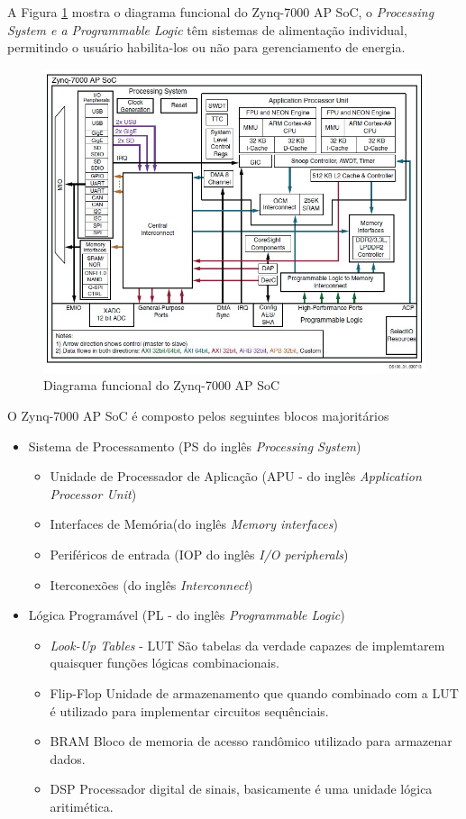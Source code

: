 A Figura \ref{diaagrama-zynq} mostra o diagrama funcional do Zynq-7000 AP SoC, o \textit{Processing System e a Programmable Logic} têm sistemas de alimentação individual, permitindo o usuário habilita-los ou não para gerenciamento de energia. 
\begin{figure}[h]
	\centering
	\includegraphics[keepaspectratio=true,scale=0.6]{figuras/diagrama-zinq.jpeg}
	\caption{Diagrama funcional do Zynq-7000 AP SoC }
	\label{diaagrama-zynq}
\end{figure}

O Zynq-7000 AP SoC é composto pelos seguintes blocos majoritários
\begin{itemize}
\item Sistema de Processamento (PS do inglês \textit{Processing System})
\begin{itemize}
\item Unidade de Processador de Aplicação (APU - do inglês \textit{Application Processor Unit})
\item  Interfaces de Memória(do inglês \textit{Memory interfaces})
\item  Periféricos de entrada (IOP do inglês \textit{I/O peripherals})
\item Iterconexões (do inglês \textit{Interconnect})
\end{itemize}
\item Lógica Programável (PL - do inglês \textit{Programmable Logic})
\begin{itemize}
	\item \textit{Look-Up Tables} - LUT
	São tabelas da verdade capazes de implemtarem quaisquer funções lógicas combinacionais.
	\item Flip-Flop
	Unidade de armazenamento que quando combinado com a LUT é utilizado para implementar circuitos sequênciais.
	\item BRAM
	Bloco de memoria de acesso randômico utilizado para armazenar dados.
	\item DSP
	Processador digital de sinais, basicamente é uma unidade lógica aritimética.
	 
\end{itemize}
\end{itemize}

